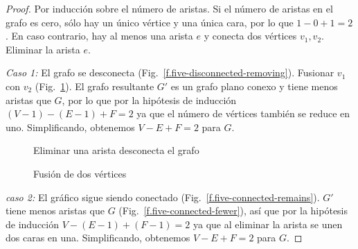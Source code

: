 \begin{proof}
Por inducción sobre el número de aristas. Si el número de aristas en el grafo es cero, sólo hay un único vértice y una única cara, por lo que $1-0+1=2$. En caso contrario, hay al menos una arista $e$ y conecta dos vértices $v_1,v_2$. Eliminar la arista $e$.

\textit{Caso 1:}
El grafo se desconecta (Fig.~\ref{f.five-disconnected-removing}). Fusionar $v_1$ con $v_2$ (Fig.~\ref{f.five-disconnected-merge}). El grafo resultante $G'$ es un grafo plano conexo y tiene menos aristas que $G$, por lo que por la hipótesis de inducción $(V-1)-(E-1)+F=2$ ya que el número de vértices también se reduce en uno. Simplificando, obtenemos $V-E+F=2$ para $G$.

\begin{figure}[ht]
\begin{minipage}{.45\textwidth}
\begin{center}
\caption{Eliminar una arista desconecta el grafo}\label{f.five-disconnected-removing}
\end{center}
\end{minipage}
\hfill
\begin{minipage}{.45\textwidth}
\begin{center}
\caption{Fusión de dos vértices}\label{f.five-disconnected-merge}
\end{center}
\end{minipage}
\end{figure}

\textit{caso 2:}
El gráfico sigue siendo conectado (Fig.~\ref{f.five-connected-remains}). $G'$ tiene menos aristas que $G$ (Fig.~\ref{f.five-connected-fewer}), así que por la hipótesis de inducción $V-(E-1)+(F-1)=2$ ya que al eliminar la arista se unen dos caras en una. Simplificando, obtenemos $V-E+F=2$ para $G$.
\end{proof}

